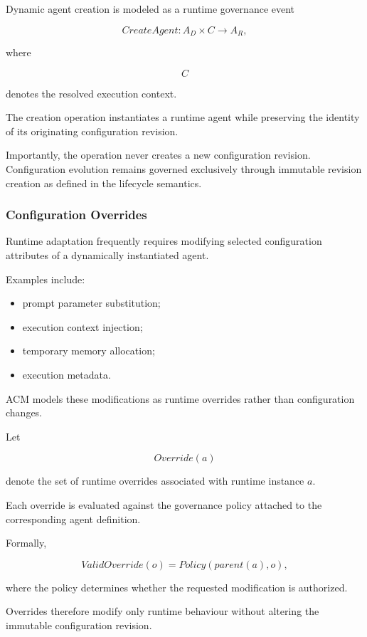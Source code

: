 \documentclass[10pt]{article}
\begin{document}
Dynamic agent creation is modeled as a runtime governance event

\[
CreateAgent
:
A_D
\times
C
\rightarrow
A_R,
\tag{33}
\]

where

\[
C
\]

denotes the resolved execution context.

The creation operation instantiates a runtime agent while preserving the
identity of its originating configuration revision.

Importantly, the operation never creates a new configuration revision.
Configuration evolution remains governed exclusively through immutable revision
creation as defined in the lifecycle semantics.

\subsubsection{Configuration Overrides}

Runtime adaptation frequently requires modifying selected configuration
attributes of a dynamically instantiated agent.

Examples include:

\begin{itemize}
\item prompt parameter substitution;
\item execution context injection;
\item temporary memory allocation;
\item execution metadata.
\end{itemize}

ACM models these modifications as runtime overrides rather than configuration
changes.

Let

\[
Override(a)
\]

denote the set of runtime overrides associated with runtime instance
$a$.

Each override is evaluated against the governance policy attached to the
corresponding agent definition.

Formally,

\[
ValidOverride(o)
=
Policy(parent(a),o),
\tag{34}
\]

where the policy determines whether the requested modification is authorized.

Overrides therefore modify only runtime behaviour without altering the
immutable configuration revision.
\end{document}
